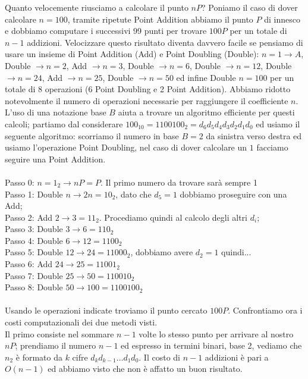 \documentclass[a4paper,12pt]{tesiinfo}
\begin{document}
Quanto velocemente riusciamo a calcolare il punto $nP$? Poniamo il caso di dover calcolare $n=100$, tramite ripetute Point Addition abbiamo il punto $P$ di innesco e dobbiamo computare i successivi 99 punti per trovare $100P$ per un totale di $n-1$ addizioni. Velocizzare questo risultato diventa davvero facile se pensiamo di usare un insieme di Point Addition (Add) e Point Doubling (Double): $n=1 \to A$, Double $\to n=2$, Add $\to n=3$, Double $\to n=6$, Double $\to n=12$, Double $\to n=24$, Add $\to n=25$, Double $\to n=50$ ed infine Double $n=100$ per un totale di 8 operazioni (6 Point Doubling e 2 Point Addition). Abbiamo ridotto notevolmente il numero di operazioni necessarie per raggiungere il coefficiente $n$. 
\\
L'uso di una notazione base $B$ aiuta a trovare un algoritmo efficiente per questi calcoli; partiamo dal considerare $100_{10} = 1100100_2 = d_6d_5d_4d_3d_2d_1d_0$ ed usiamo il seguente algoritmo: scorriamo il numero in base $B=2$ da sinistra verso destra ed usiamo l'operazione Point Doubling, nel caso di dover calcolare un $1$ facciamo seguire una Point Addition. 
\\
\\
Passo 0: $n=1_2 \to nP = P$. Il primo numero da trovare sar\`a sempre 1\\
Passo 1: Double $n \to 2n = 10_2$, dato che $d_5 = 1$ dobbiamo proseguire con una Add;\\
Passo 2: Add    $2 \to 3 = 11_2$. Procediamo quindi al calcolo degli altri $d_i$;\\
Passo 3: Double $3 \to 6 = 110_2$\\
Passo 4: Double $6 \to 12 = 1100_2$\\
Passo 5: Double $12 \to 24 = 11000_2$, dobbiamo avere $d_2 = 1$ quindi...\\
Passo 6: Add    $24 \to 25 = 11001_2$\\
Passo 7: Double $25 \to 50 = 110010_2$\\
Passo 8: Double $50 \to 100 = 1100100_2$\\
\\
Usando le operazioni indicate troviamo il punto cercato $100P$. Confrontiamo ora i costi computazionali dei due metodi visti. 
\\
Il primo consiste nel sommare $n-1$ volte lo stesso punto per arrivare al nostro $nP$; prendiamo il numero $n-1$ ed espresso in termini binari, base 2, vediamo che $n_2$ \`e formato da $k$ cifre $d_kd_{k-1} \ldots d_1d_0$. Il costo di $n-1$ addizioni \`e pari a $O(n-1)$ ed abbiamo visto che non \`e affatto un buon risultato. 
\end{document}
